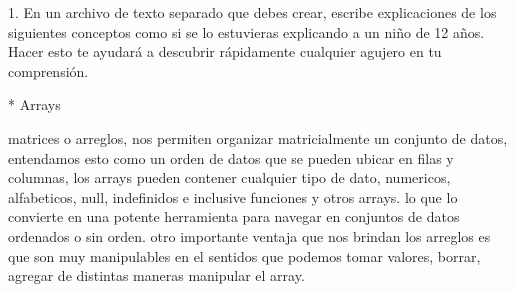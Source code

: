 1. En un archivo de texto separado que debes crear, escribe explicaciones de los siguientes conceptos 
como si se lo estuvieras explicando a un niño de 12 años. Hacer esto te ayudará a descubrir 
rápidamente cualquier agujero en tu comprensión.

	* Arrays

    matrices o arreglos, nos permiten organizar matricialmente un conjunto de datos, entendamos 
    esto como un orden de datos que se pueden ubicar en filas y columnas, los arrays pueden contener 
    cualquier tipo de dato, numericos, alfabeticos, null, indefinidos e inclusive funciones y otros arrays. 
    lo que lo convierte en una potente herramienta para navegar en conjuntos de datos ordenados o sin orden. 
    otro importante ventaja que nos brindan los arreglos es que son muy manipulables en el sentidos que 
    podemos tomar valores, borrar, agregar de distintas maneras manipular el array.

